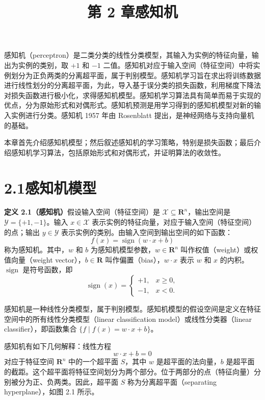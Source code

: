 \documentclass[UTF8,12pt,a4paper,fontset=fandol]{ctexart}
\title{第 2 章\quad 感知机}
\author{}
\date{}
\begin{document}
\maketitle

感知机（perceptron）是二类分类的线性分类模型，其输入为实例的特征向量，输出为实例的类别，取 $+1$ 和 $-1$ 二值。感知机对应于输入空间（特征空间）中将实例划分为正负两类的分离超平面，属于判别模型。感知机学习旨在求出将训练数据进行线性划分的分离超平面，为此，导入基于误分类的损失函数，利用梯度下降法对损失函数进行极小化，求得感知机模型。感知机学习算法具有简单而易于实现的优点，分为原始形式和对偶形式。感知机预测是用学习得到的感知机模型对新的输入实例进行分类。感知机 1957 年由 Rosenblatt 提出，是神经网络与支持向量机的基础。

本章首先介绍感知机模型；然后叙述感知机的学习策略，特别是损失函数；最后介绍感知机学习算法，包括原始形式和对偶形式，并证明算法的收敛性。

\section*{2.1\quad 感知机模型}

\noindent\textbf{定义 2.1（感知机）}\quad 假设输入空间（特征空间）是 $\mathcal{X}\subseteq\mathbf{R}^n$，输出空间是 $\mathcal{Y}=\{+1,-1\}$。输入 $x\in\mathcal{X}$ 表示实例的特征向量，对应于输入空间（特征空间）的点；输出 $y\in\mathcal{Y}$ 表示实例的类别。由输入空间到输出空间的如下函数：
\begin{equation}
  f(x)=\operatorname{sign}(w\cdot x+b)
  \tag{2.1}
\end{equation}
称为感知机。其中，$w$ 和 $b$ 为感知机模型参数，$w\in\mathbf{R}^n$ 叫作权值（weight）或权值向量（weight vector），$b\in\mathbf{R}$ 叫作偏置（bias），$w\cdot x$ 表示 $w$ 和 $x$ 的内积。$\operatorname{sign}$ 是符号函数，即
\begin{equation}
  \operatorname{sign}(x)=
  \begin{cases}
    +1, & x\ge 0,\\
    -1, & x<0.
  \end{cases}
  \tag{2.2}
\end{equation}

感知机是一种线性分类模型，属于判别模型。感知机模型的假设空间是定义在特征空间中的所有线性分类模型（linear classification model）或线性分类器（linear classifier），即函数集合 $\{f\mid f(x)=w\cdot x+b\}$。

感知机有如下几何解释：线性方程
\begin{equation}
  w\cdot x+b=0
  \tag{2.3}
\end{equation}
对应于特征空间 $\mathbf{R}^n$ 中的一个超平面 $S$，其中 $w$ 是超平面的法向量，$b$ 是超平面的截距。这个超平面将特征空间划分为两个部分。位于两部分的点（特征向量）分别被分为正、负两类。因此，超平面 $S$ 称为分离超平面（separating hyperplane），如图 2.1 所示。
\end{document}
